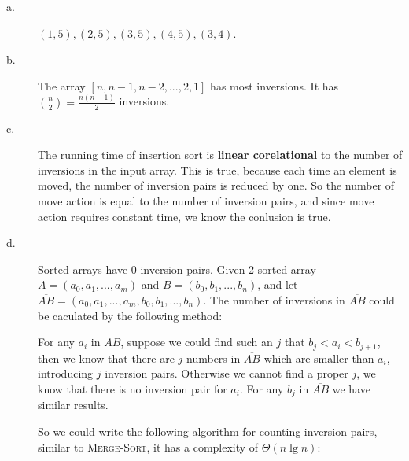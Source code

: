 \begin{description}
\item[a. \hspace{9pt}] $(1, 5), (2, 5), (3, 5), (4, 5), (3, 4)$.

\item[b. \hspace{9pt}] The array $[n, n -1, n - 2, ..., 2, 1]$ has most inversions. It has ${{n}\choose{2}} = \frac{n(n - 1)}{2}$ inversions.

\item[c. \hspace{9pt}] The running time of insertion sort is \textbf{linear corelational} to the number of inversions in the input array.
This is true, because each time an element is moved, the number of inversion pairs is reduced by one. So the number of move action is equal to
the number of inversion pairs, and since move action requires constant time, we know the conlusion is true.

\item[d. \hspace{9pt}] Sorted arrays have 0 inversion pairs. Given 2 sorted array $A=(a_0, a_1, ..., a_m)$ and $B = (b_0, b_1, ..., b_n)$,
and let $\overline{AB} = (a_0, a_1, ..., a_m, b_0, b_1, ..., b_n)$. The number of inversions in $\overline{AB}$ could be caculated by the following method:

For any $a_i$ in $\overline{AB}$, suppose we could find such an $j$ that $b_j < a_i < b_{j + 1}$, then we know that there are $j$ numbers in $\overline{AB}$
which are smaller than $a_i$, introducing $j$ inversion pairs. Otherwise we cannot find a proper $j$, we know that there is no inversion pair for $a_i$.
For any $b_j$ in $\overline{AB}$ we have similar results.

So we could write the following algorithm for counting inversion pairs, similar to \textsc{Merge-Sort}, it has a complexity of $\Theta(n\lg n)$:


\end{description}
